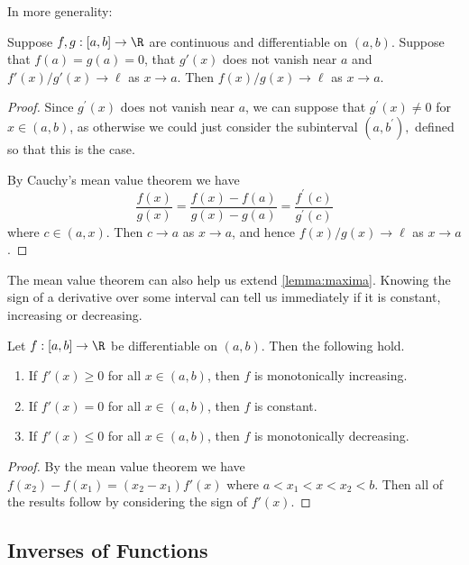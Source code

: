 \documentclass[a4paper]{scrartcl}
\begin{document}
In more generality:

\begin{theorem}
	Suppose $f, g :[a, b] \rightarrow \R$ are continuous and differentiable on $(a, b)$. Suppose that $f(a) = g(a) = 0$, that $g'(x)$ does not vanish near $a$ and $f'(x)/g'(x) \rightarrow \ell$ as $x \rightarrow a$. Then $f(x)/g(x) \rightarrow \ell$ as $x \rightarrow a$.
\end{theorem}
\begin{proof}
Since $g^{\prime}(x)$ does not vanish near $a$, we can suppose that $g^{\prime}(x) \neq 0$ for $x \in(a, b)$, as otherwise we could just consider the subinterval $\left(a, b^{\prime}\right),$ defined so that this is the case.

By Cauchy's mean value theorem we have
$$
\frac{f(x)}{g(x)}=\frac{f(x)-f(a)}{g(x)-g(a)}=\frac{f^{\prime}(c)}{g^{\prime}(c)}
$$
where $c \in(a, x)$. Then $c \rightarrow a$ as $x \rightarrow a$, and hence $f(x) / g(x) \rightarrow \ell$ as $x \rightarrow a$.
\end{proof}

The mean value theorem can also help us extend \autoref{lemma:maxima}. Knowing the sign of a derivative over some interval can tell us immediately if it is constant, increasing or decreasing.

\begin{proposition}\label{prop:sign}
	Let $f: [a, b] \rightarrow \R$ be differentiable on $(a, b)$. Then the following hold.
	\begin{enumerate}[label=(\roman*)]
		\item If $f'(x) \geq 0$ for all $x \in (a, b)$, then $f$ is monotonically increasing.
		\item If $f'(x) = 0$ for all $x \in (a, b)$, then $f$ is constant.
		\item If $f'(x) \leq 0$ for all $x \in (a, b)$, then $f$ is monotonically decreasing.
	\end{enumerate}
\end{proposition}
\begin{proof}
	By the mean value theorem we have $f(x_2) - f(x_1) = (x_2 - x_1)f'(x)$ where $a < x_1 < x < x_2 < b$. Then all of the results follow by considering the sign of $f'(x)$.
\end{proof}

\subsection{Inverses of Functions}
\end{document}
